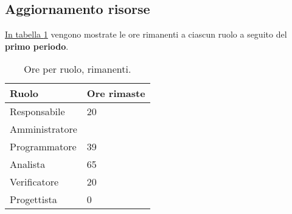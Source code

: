 \subsection{Aggiornamento risorse}

\label{sec:AggiornamentoRisorse_PrimoPeriodo}



\hyperref[tab:risorse_rimaste_primo_periodo]{In tabella \ref{tab:risorse_rimaste_primo_periodo}} vengono mostrate le ore rimanenti a ciascun ruolo a seguito del \textbf{primo periodo}.
\begin{table}[!h]
    \centering
    \begin{tabular}{| l | l |}
    \hline
        \textbf{Ruolo} & 
        \textbf{Ore rimaste}\\
    \hline
        Responsabile & 20\\
    \hline
        Amministratore & \\
    \hline
        Programmatore & 39\\
    \hline
        Analista & 65\\
    \hline
        Verificatore & 20\\
    \hline
        Progettista & 0\\
    \hline
    \end{tabular}
    \caption{Ore per ruolo, rimanenti.}
    \label{tab:risorse_rimaste_primo_periodo} 
\end{table}